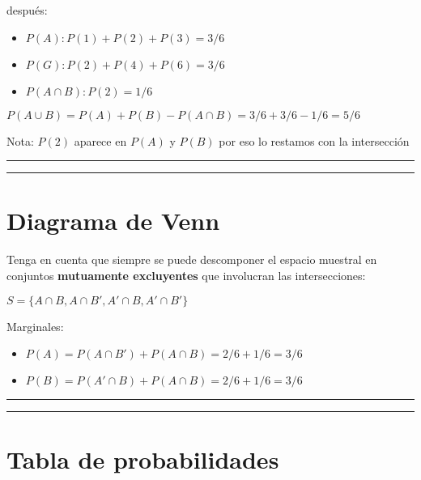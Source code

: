 \documentclass[
]{book}
\providecommand{\tightlist}{%
  \setlength{\itemsep}{0pt}\setlength{\parskip}{0pt}}
\begin{document}
después:

\begin{itemize}
\tightlist
\item
  \(P(A): P(1) + P(2) + P(3)=3/6\)
\item
  \(P(G): P(2) + P(4) + P(6)=3/6\)
\item
  \(P(A \cap B): P(2) = 1/6\)
\end{itemize}

\(P(A\cup B)=P(A) + P(B) - P(A\cap B)=3/6+3/6-1/6=5/6\)

Nota: \(P(2)\) aparece en \(P(A)\) y \(P(B)\) por eso lo restamos con la intersección

\begin{center}\rule{0.5\linewidth}{0.5pt}\end{center}

\begin{center}\rule{0.5\linewidth}{0.5pt}\end{center}

\hypertarget{diagrama-de-venn}{%
\section{Diagrama de Venn}\label{diagrama-de-venn}}

Tenga en cuenta que siempre se puede descomponer el espacio muestral en conjuntos \textbf{mutuamente excluyentes} que involucran las intersecciones:

\(S=\{A\cap B, A \cap B', A'\cap B, A'\cap B'\}\)

Marginales:

\begin{itemize}
\tightlist
\item
  \(P(A)=P(A\cap B') + P(A \cap B)=2/6+1/6=3/6\)
\item
  \(P(B)=P(A'\cap B) +P(A \cap B)=2/6+1/6=3/6\)
\end{itemize}

\begin{center}\rule{0.5\linewidth}{0.5pt}\end{center}

\begin{center}\rule{0.5\linewidth}{0.5pt}\end{center}

\hypertarget{tabla-de-probabilidades}{%
\section{Tabla de probabilidades}\label{tabla-de-probabilidades}}
\end{document}
